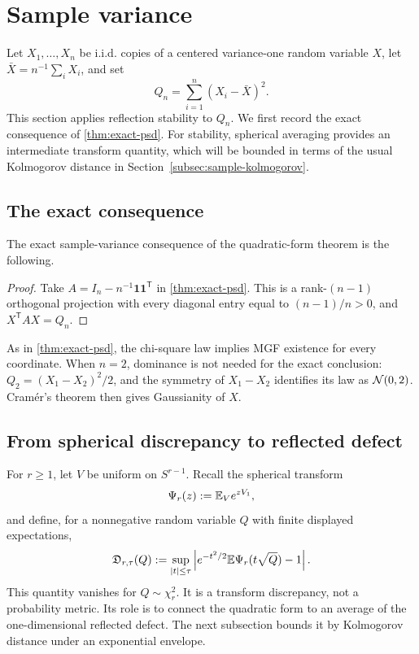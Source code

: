 \section{Sample variance}\label{sec:sample-var}

Let $X_1,\ldots,X_n$ be i.i.d. copies of a centered variance-one random variable $X$, let $\bar X=n^{-1}\sum_iX_i$, and set
\[
Q_n=\sum_{i=1}^n(X_i-\bar X)^2.
\]
This section applies reflection stability to $Q_n$. We first record the exact consequence of \cref{thm:exact-psd}. For stability, spherical averaging provides an intermediate transform quantity, which will be bounded in terms of the usual Kolmogorov distance in Section~\ref{subsec:sample-kolmogorov}.

\subsection{The exact consequence}

The exact sample-variance consequence of the quadratic-form theorem is the following.

\begin{proof}
Take $A=I_n-n^{-1}\mathbf1\mathbf1^{\mathsf T}$ in \cref{thm:exact-psd}. This is a rank-$(n-1)$ orthogonal projection with every diagonal entry equal to $(n-1)/n>0$, and $X^{\mathsf T}AX=Q_n$.
\end{proof}

As in \cref{thm:exact-psd}, the chi-square law implies MGF existence for every coordinate. When $n=2$, dominance is not needed for the exact conclusion: $Q_2=(X_1-X_2)^2/2$, and the symmetry of $X_1-X_2$ identifies its law as $\mathcal N(0,2)$. Cram\'er's theorem then gives Gaussianity of $X$.

\subsection{From spherical discrepancy to reflected defect}

For $r\ge1$, let $V$ be uniform on $S^{r-1}$. Recall the spherical transform
\[
\Psi_r(z):=\mathbb E_V e^{zV_1},
\]
and define, for a nonnegative random variable $Q$ with finite displayed expectations,
\[
\mathfrak D_{r,\tau}(Q):=
\sup_{|t|\le\tau}
\left|e^{-t^2/2}\mathbb E\Psi_r(t\sqrt Q)-1\right|.
\]
This quantity vanishes for $Q\sim\chi_r^2$. It is a transform discrepancy, not a probability metric. Its role is to connect the quadratic form to an average of the one-dimensional reflected defect. The next subsection bounds it by Kolmogorov distance under an exponential envelope.

